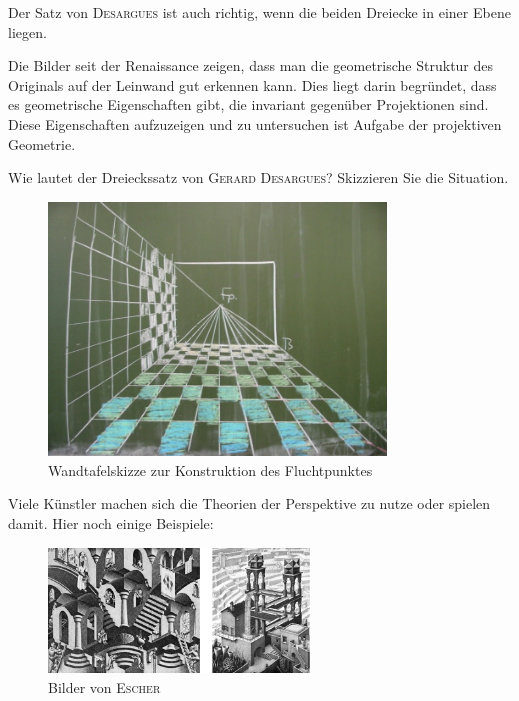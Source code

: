 \documentclass[%
11pt,%
twoside,%
titlepage,%
a4page,%
german,%
headsepline%
]{scrartcl}
\begin{document}
Der Satz von \textsc{Desargues} ist auch richtig, wenn die beiden Dreiecke in einer Ebene liegen.

Die Bilder seit der Renaissance zeigen, dass man die geometrische Struktur des Originals auf der Leinwand gut erkennen kann. Dies liegt darin begr\"undet, dass es geometrische Eigenschaften gibt, die invariant gegen\"uber Projektionen sind. Diese Eigenschaften aufzuzeigen und zu untersuchen ist Aufgabe der projektiven Geometrie.

\begin{ueb}
Wie lautet der Dreieckssatz von \textsc{Gerard Desargues}? Skizzieren Sie die Situation.
\end{ueb}

\begin{figure}[h!]
\begin{center}
\includegraphics[width=0.8\textwidth]{pictures/fluchtp}
\caption{Wandtafelskizze zur Konstruktion des Fluchtpunktes}
\end{center}
\end{figure}

Viele K\"unstler machen sich die Theorien der Perspektive zu nutze oder spielen damit. Hier noch einige Beispiele:

\begin{figure}[h!]
\begin{center}
\includegraphics[width=0.618\textwidth]{pictures/escher}
\caption{Bilder von \textsc{Escher}}
\end{center}
\end{figure}
\end{document}
